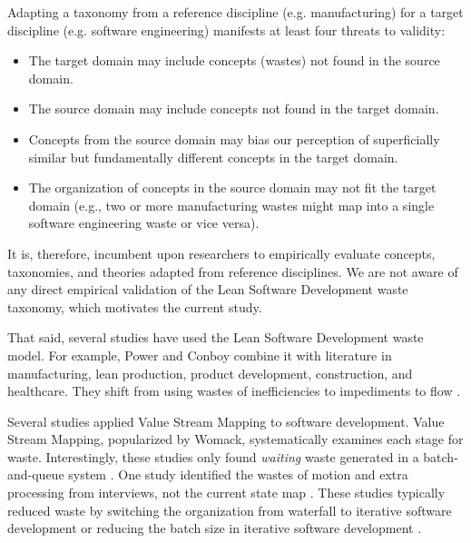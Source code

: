 Adapting a taxonomy from a reference discipline (e.g. manufacturing) for a target discipline (e.g. software engineering) manifests at least four threats to validity: 
\begin{itemize}
  \item The target domain may include concepts (wastes) not found in the source domain. 
  \item The source domain may include concepts not found in the target domain.
  \item Concepts from the source domain may bias our perception of superficially similar but fundamentally different concepts in the target domain.
  \item The organization of concepts in the source domain may not fit the target domain (e.g., two or more manufacturing wastes might map into a single software engineering waste or vice versa). 
\end{itemize}
It is, therefore, incumbent upon researchers to empirically evaluate concepts, taxonomies, and theories adapted from reference disciplines. We are not aware of any direct empirical validation of the Lean Software Development waste taxonomy, which motivates the current study. 

That said, several studies have used the Lean Software Development waste model. For example, Power and Conboy combine it with literature in manufacturing, lean production, product development, construction, and healthcare. They shift from using wastes of inefficiencies to impediments to flow \cite{PowerImpediments}.


Several studies applied Value Stream Mapping to software development. Value Stream Mapping, popularized by Womack, systematically examines each stage for waste. Interestingly, these studies only found \textit{waiting} waste generated in a batch-and-queue system \cite{Ali2016, Khurum2014, Mujtaba2010}. One study identified the wastes of motion and extra processing from interviews, not the current state map \cite{Mujtaba2010}. These studies typically reduced waste by switching the organization from waterfall to iterative software development or reducing the batch size in iterative software development \cite{Ali2016, Khurum2014, Mujtaba2010}.


